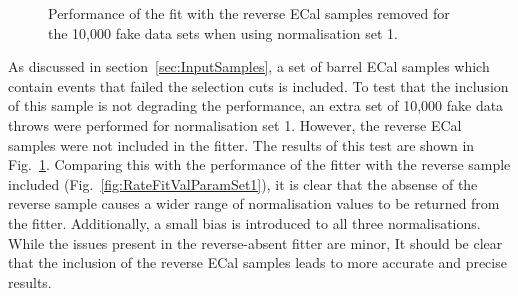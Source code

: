 \begin{figure}%
  \centering
  \caption{Performance of the fit with the reverse ECal samples removed for the 10,000 fake data sets when using normalisation set 1.}
  \label{fig:RateFitValParamSet1NoReverse}
\end{figure}
\newline
\newline
As discussed in section~\ref{sec:InputSamples}, a set of barrel ECal samples which contain events that failed the selection cuts is included.  To test that the inclusion of this sample is not degrading the performance, an extra set of 10,000 fake data throws were performed for normalisation set 1.  However, the reverse ECal samples were not included in the fitter.  The results of this test are shown in Fig.~\ref{fig:RateFitValParamSet1NoReverse}.  Comparing this with the performance of the fitter with the reverse sample included (Fig.~\ref{fig:RateFitValParamSet1}), it is clear that the absense of the reverse sample causes a wider range of normalisation values to be returned from the fitter.  Additionally, a small bias is introduced to all three normalisations.  While the issues present in the reverse-absent fitter are minor, It should be clear that the inclusion of the reverse ECal samples leads to more accurate and precise results.

